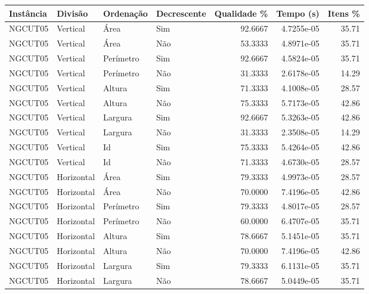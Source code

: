 \begin{tabular}{llllrrr}
    \hline
    Instância & Divisão     & Ordenação & Decrescente & Qualidade \% & Tempo (s)  & Itens \% \\
    \hline
    NGCUT05   & Vertical    & Área      & Sim         & 92.6667      & 4.7255e-05 & 35.71    \\
    NGCUT05   & Vertical    & Área      & Não         & 53.3333      & 4.8971e-05 & 35.71    \\
    NGCUT05   & Vertical    & Perímetro & Sim         & 92.6667      & 4.5824e-05 & 35.71    \\
    NGCUT05   & Vertical    & Perímetro & Não         & 31.3333      & 2.6178e-05 & 14.29    \\
    NGCUT05   & Vertical    & Altura    & Sim         & 71.3333      & 4.1008e-05 & 28.57    \\
    NGCUT05   & Vertical    & Altura    & Não         & 75.3333      & 5.7173e-05 & 42.86    \\
    NGCUT05   & Vertical    & Largura   & Sim         & 92.6667      & 5.3263e-05 & 42.86    \\
    NGCUT05   & Vertical    & Largura   & Não         & 31.3333      & 2.3508e-05 & 14.29    \\
    NGCUT05   & Vertical    & Id        & Sim         & 75.3333      & 5.4264e-05 & 42.86    \\
    NGCUT05   & Vertical    & Id        & Não         & 71.3333      & 4.6730e-05 & 28.57    \\
    NGCUT05   & Horizontal  & Área      & Sim         & 79.3333      & 4.9973e-05 & 28.57    \\
    NGCUT05   & Horizontal  & Área      & Não         & 70.0000      & 7.4196e-05 & 42.86    \\
    NGCUT05   & Horizontal  & Perímetro & Sim         & 79.3333      & 4.8017e-05 & 28.57    \\
    NGCUT05   & Horizontal  & Perímetro & Não         & 60.0000      & 6.4707e-05 & 35.71    \\
    NGCUT05   & Horizontal  & Altura    & Sim         & 78.6667      & 5.1451e-05 & 35.71    \\
    NGCUT05   & Horizontal  & Altura    & Não         & 70.0000      & 7.4196e-05 & 42.86    \\
    NGCUT05   & Horizontal  & Largura   & Sim         & 79.3333      & 6.1131e-05 & 35.71    \\
    NGCUT05   & Horizontal  & Largura   & Não         & 78.6667      & 5.0449e-05 & 35.71    \\

\end{tabular}
